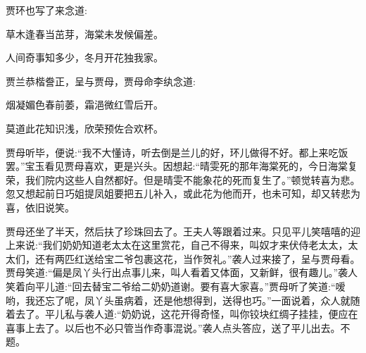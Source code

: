 \begin{parag}
    贾环也写了来念道:
\end{parag}

\begin{poem}
    \begin{pl}
        草木逢春当茁芽，海棠未发候偏差。
    \end{pl}


    \begin{pl}
        人间奇事知多少，冬月开花独我家。
    \end{pl}
\end{poem}


\begin{parag}
    贾兰恭楷誊正，呈与贾母，贾母命李纨念道:
\end{parag}


\begin{poem}


    \begin{pl}
        烟凝媚色春前萎，霜浥微红雪后开。
    \end{pl}


    \begin{pl}
        莫道此花知识浅，欣荣预佐合欢杯。
    \end{pl}

\end{poem}

\begin{parag}
    贾母听毕，便说:“我不大懂诗，听去倒是兰儿的好，环儿做得不好。都上来吃饭罢。”宝玉看见贾母喜欢，更是兴头。因想起:“晴雯死的那年海棠死的，今日海棠复荣，我们院内这些人自然都好。但是晴雯不能象花的死而复生了。”顿觉转喜为悲。忽又想起前日巧姐提凤姐要把五儿补入，或此花为他而开，也未可知，却又转悲为喜，依旧说笑。
\end{parag}


\begin{parag}
    贾母还坐了半天，然后扶了珍珠回去了。王夫人等跟着过来。只见平儿笑嘻嘻的迎上来说:“我们奶奶知道老太太在这里赏花，自己不得来，叫奴才来伏侍老太太，太太们，还有两匹红送给宝二爷包裹这花，当作贺礼。”袭人过来接了，呈与贾母看。贾母笑道:“偏是凤丫头行出点事儿来，叫人看着又体面，又新鲜，很有趣儿。”袭人笑着向平儿道:“回去替宝二爷给二奶奶道谢。要有喜大家喜。”贾母听了笑道:“嗳哟，我还忘了呢，凤丫头虽病着，还是他想得到，送得也巧。”一面说着，众人就随着去了。平儿私与袭人道:“奶奶说，这花开得奇怪，叫你铰块红绸子挂挂，便应在喜事上去了。以后也不必只管当作奇事混说。”袭人点头答应，送了平儿出去。不题。
\end{parag}



